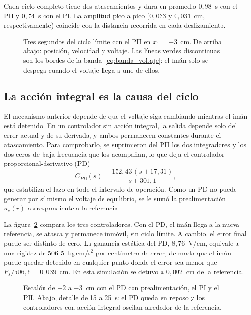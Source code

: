 Cada ciclo completo tiene dos atascamientos y dura en promedio $0{,}98$~s con el PII y $0{,}74$~s con el PI. La amplitud pico a pico ($0{,}033$ y $0{,}031$~cm, respectivamente) coincide con la distancia recorrida en cada deslizamiento.

\begin{figure}[ht]
    \centering
    
    \caption[Anatomía del ciclo límite]{Tres segundos del ciclo límite con el PII en $x_1=-3$~cm. De arriba abajo: posición, velocidad y voltaje. Las líneas verdes discontinuas son los bordes de la banda~\eqref{eq:banda_voltaje}: el imán solo se despega cuando el voltaje llega a uno de ellos.}
    \label{fig:anatomia}
\end{figure}

\subsection{La acción integral es la causa del ciclo}

El mecanismo anterior depende de que el voltaje siga cambiando mientras el imán está detenido. En un controlador sin acción integral, la salida depende solo del error actual y de su derivada, y ambos permanecen constantes durante el atascamiento. Para comprobarlo, se suprimieron del PII los dos integradores y los dos ceros de baja frecuencia que los acompañan, lo que deja el controlador proporcional-derivativo (PD)
\begin{equation}
C_{PD}(s) = \frac{152{,}43\,(s+17{,}31)}{s+301{,}1} ,
\label{eq:pd}
\end{equation}
que estabiliza el lazo en todo el intervalo de operación. Como un PD no puede generar por sí mismo el voltaje de equilibrio, se le sumó la prealimentación $u_e(r)$ correspondiente a la referencia.

La figura~\ref{fig:pd_pi_pii} compara los tres controladores. Con el PD, el imán llega a la nueva referencia, se atasca y permanece inmóvil, sin ciclo límite. A cambio, el error final puede ser distinto de cero. La ganancia estática del PD, $8{,}76$~V/cm, equivale a una rigidez de $506{,}5$~kg\,cm/s$^2$ por centímetro de error, de modo que el imán puede quedar detenido en cualquier punto donde el error sea menor que $F_s/506{,}5 = 0{,}039$~cm. En esta simulación se detuvo a $0{,}002$~cm de la referencia.

\begin{figure}[ht]
    \centering
    
    \caption[PD, PI y PII con atascamiento-deslizamiento]{Escalón de $-2$ a $-3$~cm con el PD con prealimentación, el PI y el PII. Abajo, detalle de 15 a 25~s: el PD queda en reposo y los controladores con acción integral oscilan alrededor de la referencia.}
    \label{fig:pd_pi_pii}
\end{figure}

